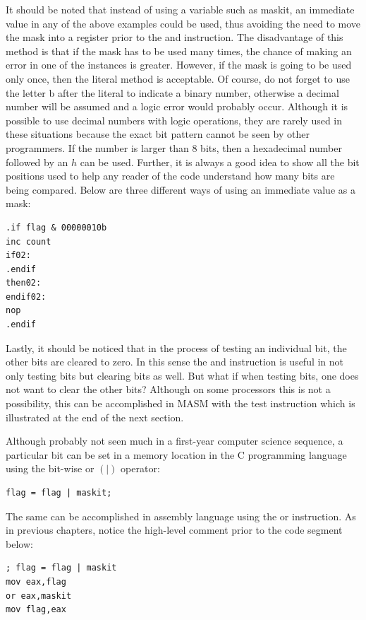 \documentclass[10pt]{book}
\begin{document}
It should be noted that instead of using a variable such as maskit, an immediate value in any of the above examples could be used, thus avoiding the need to move the mask into a register prior to the and instruction. The disadvantage of this method is that if the mask has to be used many times, the chance of making an error in one of the instances is greater. However, if the mask is going to be used only once, then the literal method is acceptable. Of course, do not forget to use the letter b after the literal to indicate a binary number, otherwise a decimal number will be assumed and a logic error would probably occur. Although it is possible to use decimal numbers with logic operations, they are rarely used in these situations because the exact bit pattern cannot be seen by other programmers. If the number is larger than 8 bits, then a hexadecimal number followed by an $h$ can be used. Further, it is always a good idea to show all the bit positions used to help any reader of the code understand how many bits are being compared. Below are three different ways of using an immediate value as a mask:

\begin{verbatim}
.if flag & 00000010b
inc count
if02:
.endif
then02:
endif02:
nop
.endif
\end{verbatim}

Lastly, it should be noticed that in the process of testing an individual bit, the other bits are cleared to zero. In this sense the and instruction is useful in not only testing bits but clearing bits as well. But what if when testing bits, one does not want to clear the other bits? Although on some processors this is not a possibility, this can be accomplished in MASM with the test instruction which is illustrated at the end of the next section.

Although probably not seen much in a first-year computer science sequence, a particular bit can be set in a memory location in the C programming language using the bit-wise or $(\mid)$ operator:

\begin{verbatim}
flag = flag | maskit;
\end{verbatim}

The same can be accomplished in assembly language using the or instruction. As in previous chapters, notice the high-level comment prior to the code segment below:

\begin{verbatim}
; flag = flag | maskit
mov eax,flag
or eax,maskit
mov flag,eax
\end{verbatim}
\end{document}
